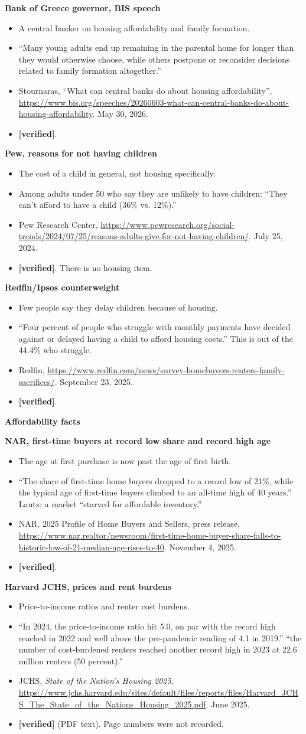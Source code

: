 \documentclass[10pt]{article}
\newcommand{\ok}{\textcolor{green!45!black}{\textbf{[verified]}}}
\newcommand{\entry}[5]{%
  \textbf{#1}\par
  \begin{itemize}
    \item #2
    \item #3
    \item #4
    \item #5
  \end{itemize}}
\begin{document}
\entry{Bank of Greece governor, BIS speech}
{A central banker on housing affordability and family formation.}
{``Many young adults end up remaining in the parental home for longer than they would otherwise choose, while others postpone or reconsider decisions related to family formation altogether.''}
{Stournaras, ``What can central banks do about housing affordability'', \url{https://www.bis.org/speeches/20260603-what-can-central-banks-do-about-housing-affordability}. May 30, 2026.}
{\ok.}

\entry{Pew, reasons for not having children}
{The cost of a child in general, not housing specifically.}
{Among adults under 50 who say they are unlikely to have children: ``They can't afford to have a child (36\% vs. 12\%).''}
{Pew Research Center, \url{https://www.pewresearch.org/social-trends/2024/07/25/reasons-adults-give-for-not-having-children/}. July 25, 2024.}
{\ok. There is no housing item.}

\entry{Redfin/Ipsos counterweight}
{Few people say they delay children because of housing.}
{``Four percent of people who struggle with monthly payments have decided against or delayed having a child to afford housing costs.'' This is out of the 44.4\% who struggle.}
{Redfin, \url{https://www.redfin.com/news/survey-homebuyers-renters-family-sacrifices/}. September 23, 2025.}
{\ok.}

\textbf{Affordability facts}

\entry{NAR, first-time buyers at record low share and record high age}
{The age at first purchase is now past the age of first birth.}
{``The share of first-time home buyers dropped to a record low of 21\%, while the typical age of first-time buyers climbed to an all-time high of 40 years.'' Lautz: a market ``starved for affordable inventory.''}
{NAR, 2025 Profile of Home Buyers and Sellers, press release, \url{https://www.nar.realtor/newsroom/first-time-home-buyer-share-falls-to-historic-low-of-21-median-age-rises-to-40}. November 4, 2025.}
{\ok.}

\entry{Harvard JCHS, prices and rent burdens}
{Price-to-income ratios and renter cost burdens.}
{``In 2024, the price-to-income ratio hit 5.0, on par with the record high reached in 2022 and well above the pre-pandemic reading of 4.1 in 2019.'' ``the number of cost-burdened renters reached another record high in 2023 at 22.6 million renters (50 percent).''}
{JCHS, \emph{State of the Nation's Housing 2025}, \url{https://www.jchs.harvard.edu/sites/default/files/reports/files/Harvard_JCHS_The_State_of_the_Nations_Housing_2025.pdf}. June 2025.}
{\ok{} (PDF text). Page numbers were not recorded.}
\end{document}
